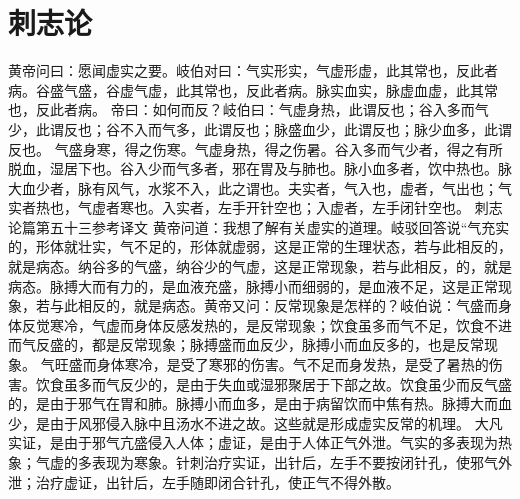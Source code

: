 \documentclass[a4paper,12pt,UTF8,twoside]{ctexbook}
\begin{document}
\chapter{刺志论}
黄帝问曰：愿闻虚实之要。岐伯对曰：气实形实，气虚形虚，此其常也，反此者病。谷盛气盛，谷虚气虚，此其常也，反此者病。脉实血实，脉虚血虚，此其常也，反此者病。
帝曰：如何而反？岐伯曰：气虚身热，此谓反也；谷入多而气少，此谓反也；谷不入而气多，此谓反也；脉盛血少，此谓反也；脉少血多，此谓反也。
气盛身寒，得之伤寒。气虚身热，得之伤暑。谷入多而气少者，得之有所脱血，湿居下也。谷入少而气多者，邪在胃及与肺也。脉小血多者，饮中热也。脉大血少者，脉有风气，水浆不入，此之谓也。夫实者，气入也，虚者，气出也；气实者热也，气虚者寒也。入实者，左手开针空也；入虚者，左手闭针空也。
刺志论篇第五十三参考译文
黄帝问道：我想了解有关虚实的道理。岐驳回答说“气充实的，形体就壮实，气不足的，形体就虚弱，这是正常的生理状态，若与此相反的，就是病态。纳谷多的气盛，纳谷少的气虚，这是正常现象，若与此相反，的，就是病态。脉搏大而有力的，是血液充盛，脉搏小而细弱的，是血液不足，这是正常现象，若与此相反的，就是病态。黄帝又问：反常现象是怎样的？岐伯说：气盛而身体反觉寒冷，气虚而身体反感发热的，是反常现象；饮食虽多而气不足，饮食不进而气反盛的，都是反常现象；脉搏盛而血反少，脉搏小而血反多的，也是反常现象。
气旺盛而身体寒冷，是受了寒邪的伤害。气不足而身发热，是受了暑热的伤害。饮食虽多而气反少的，是由于失血或湿邪聚居于下部之故。饮食虽少而反气盛的，是由于邪气在胃和肺。脉搏小而血多，是由于病留饮而中焦有热。脉搏大而血少，是由于风邪侵入脉中且汤水不进之故。这些就是形成虚实反常的机理。
大凡实证，是由于邪气亢盛侵入人体；虚证，是由于人体正气外泄。气实的多表现为热象；气虚的多表现为寒象。针刺治疗实证，出针后，左手不要按闭针孔，使邪气外泄；治疗虚证，出针后，左手随即闭合针孔，使正气不得外散。
\end{document}
